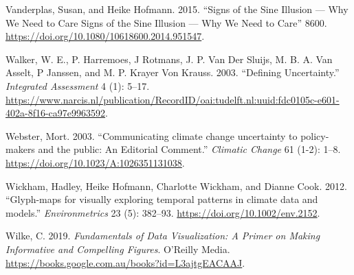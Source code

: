 \documentclass[
  letterpaper,
  DIV=11,
  numbers=noendperiod]{scrartcl}
\newlength{\cslhangindent}
\newlength{\cslentryspacingunit} %
\newenvironment{CSLReferences}[2] %
 {%
  \setlength{\parindent}{0pt}
  \ifodd #1
  \let\oldpar\par
  \def\par{\hangindent=\cslhangindent\oldpar}
  \fi
  \setlength{\parskip}{#2\cslentryspacingunit}
 }%
 {}
\begin{document}
\begin{CSLReferences}{1}{0}
\leavevmode{}%
Vanderplas, Susan, and Heike Hofmann. 2015. {``{Signs of the Sine
Illusion --- Why We Need to Care Signs of the Sine Illusion --- Why We
Need to Care}''} 8600.
\url{https://doi.org/10.1080/10618600.2014.951547}.

\leavevmode{}%
Walker, W. E., P. Harremoes, J Rotmans, J. P. Van Der Sluijs, M. B. A.
Van Asselt, P Janssen, and M. P. Krayer Von Krauss. 2003. {``{Defining
Uncertainty}.''} \emph{Integrated Assessment} 4 (1): 5--17.
\url{https://www.narcis.nl/publication/RecordID/oai:tudelft.nl:uuid:fdc0105c-e601-402a-8f16-ca97e9963592}.

\leavevmode{}%
Webster, Mort. 2003. {``{Communicating climate change uncertainty to
policy-makers and the public: An Editorial Comment}.''} \emph{Climatic
Change} 61 (1-2): 1--8. \url{https://doi.org/10.1023/A:1026351131038}.

\leavevmode{}%
Wickham, Hadley, Heike Hofmann, Charlotte Wickham, and Dianne Cook.
2012. {``{Glyph-maps for visually exploring temporal patterns in climate
data and models}.''} \emph{Environmetrics} 23 (5): 382--93.
\url{https://doi.org/10.1002/env.2152}.

\leavevmode{}%
Wilke, C. 2019. \emph{Fundamentals of Data Visualization: A Primer on
Making Informative and Compelling Figures}. O'Reilly Media.
\url{https://books.google.com.au/books?id=L3ajtgEACAAJ}.

\end{CSLReferences}
\end{document}
